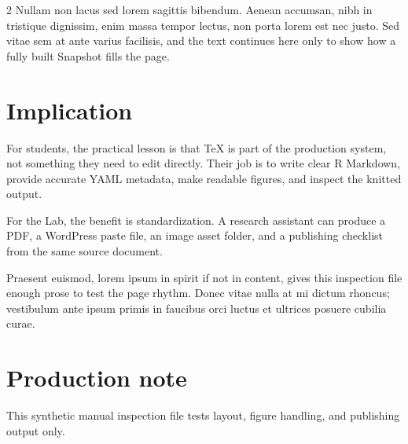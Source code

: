 \documentclass[12pt]{article}
\begin{document}
\begin{paracol}{2}
Nullam non lacus sed lorem sagittis bibendum. Aenean accumsan, nibh in
tristique dignissim, enim massa tempor lectus, non porta lorem est nec
justo. Sed vitae sem at ante varius facilisis, and the text continues
here only to show how a fully built Snapshot fills the page.

\section{Implication}\label{implication}

For students, the practical lesson is that TeX is part of the production
system, not something they need to edit directly. Their job is to write
clear R Markdown, provide accurate YAML metadata, make readable figures,
and inspect the knitted output.

For the Lab, the benefit is standardization. A research assistant can
produce a PDF, a WordPress paste file, an image asset folder, and a
publishing checklist from the same source document.

Praesent euismod, lorem ipsum in spirit if not in content, gives this
inspection file enough prose to test the page rhythm. Donec vitae nulla
at mi dictum rhoncus; vestibulum ante ipsum primis in faucibus orci
luctus et ultrices posuere cubilia curae.

\section{Production note}\label{production-note}

This synthetic manual inspection file tests layout, figure handling, and
publishing output only.


\end{paracol}
\end{document}
